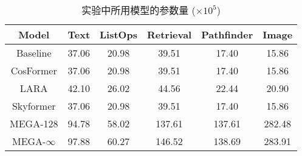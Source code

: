 \begin{table}[htbp]
  \centering

  \caption{实验中所用模型的参数量 ($\times 10^5$)}
    \begin{tabular}{c|ccccc}
    \hline
    Model & Text  & ListOps & Retrieval & Pathfinder & Image \bigstrut\\
    \hline
    Baseline & 37.06  & 20.98  & 39.51  & 17.40  & 15.86  \bigstrut[t]\\
    CosFormer & 37.06  & 20.98  & 39.51  & 17.40  & 15.86  \\
    LARA  & 42.10  & 26.02  & 44.56  & 22.44  & 20.90  \\
    Skyformer & 37.06  & 20.98  & 39.51  & 17.40  & 15.86  \bigstrut[b]\\
    \hline
    MEGA-128 & 94.78  & 58.02  & 137.61  & 137.61  & 282.48  \bigstrut[t]\\
    MEGA-$\infty$ & 97.88  & 60.27  & 146.52  & 138.69  & 283.91  \bigstrut[b]\\
    \hline
    \end{tabular}%
  \label{tab:model_size}
\end{table}%
